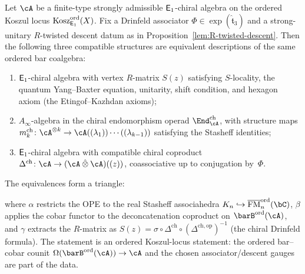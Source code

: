 \begin{theorem}
\label{thm:chiral-qg-equiv}
\ClaimStatusConditional
{}
Let $\cA$ be a finite-type strongly admissible $\mathsf{E}_1$-chiral
algebra on the ordered Koszul locus
\(\operatorname{Kosz}^{\mathrm{ord}}_{\mathsf{E}_1}(X)\). Fix a Drinfeld associator
$\Phi \in \exp(\hat{\mathfrak{t}}_3)$ and a strong-unitary
$R$-twisted descent datum as in
Proposition~\textup{\ref{lem:R-twisted-descent}}. Then the following
three compatible structures are equivalent descriptions of the same
ordered bar coalgebra:
\begin{enumerate}[label=\textup{(\Roman*)}]
\item $\mathsf{E}_1$-chiral algebra with vertex $R$-matrix $S(z)$
 satisfying $S$-locality, the quantum Yang--Baxter equation,
 unitarity, shift condition, and hexagon axiom
 \textup{(}the Etingof--Kazhdan axioms\textup{)};
\item $A_\infty$-algebra in the chiral endomorphism operad
 $\End^{\mathrm{ch}}_\cA$, with structure maps
 $m_k^{\mathrm{ch}} \colon \cA^{\otimes k} \to
 \cA((\lambda_1))\cdots((\lambda_{k-1}))$
 satisfying the Stasheff identities;
\item $\mathsf{E}_1$-chiral algebra with compatible chiral coproduct
 $\Delta^{\mathrm{ch}} \colon
 \cA \to (\cA \mathbin{\hat\otimes} \cA)((z))$,
 coassociative up to conjugation by~$\Phi$.
\end{enumerate}
The equivalences form a triangle:
\begin{center}
\end{center}
where $\alpha$ restricts the OPE to the real
Stasheff associahedra $K_n \hookrightarrow
\overline{\operatorname{FM}}_n^{\mathrm{ord}}(\bC)$,
$\beta$ applies the cobar functor to the deconcatenation
coproduct on $\barB^{\mathrm{ord}}(\cA)$, and
$\gamma$ extracts the $R$-matrix as
$S(z) = \sigma \circ \Delta^{\mathrm{ch}}
\circ (\Delta^{\mathrm{ch},\mathrm{op}})^{-1}$
\textup{(}the chiral Drinfeld formula\textup{)}. The statement is an
ordered Koszul-locus statement: the ordered bar--cobar counit
$\Omega(\barB^{\mathrm{ord}}(\cA))\to\cA$ and the chosen
associator/descent gauges are part of the data.
\end{theorem}

